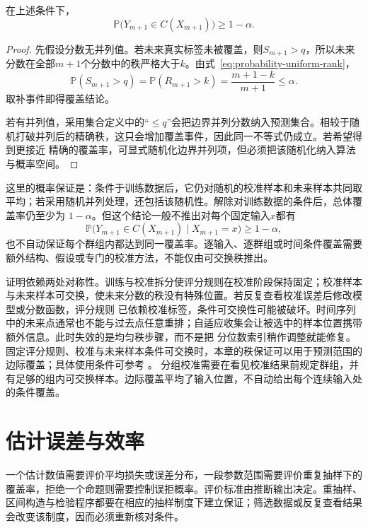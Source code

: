 \begin{theorem}[拆分共形的有限样本覆盖]
\label{thm:probability-split-conformal-coverage}
在上述条件下，
\[ \mathbb{P}\bigl(
    Y_{m+1}\in C(X_{m+1})\bigr)\geq 1-\alpha. \]
\end{theorem}

\begin{proof}
先假设分数无并列值。若未来真实标签未被覆盖，则\(S_{m+1}>q\)，所以未来分数在全部\(m+1\)个分数中的秩严格大于\(k\)。由式~\eqref{eq:probability-uniform-rank}，
\[ \mathbb{P}(S_{m+1}>q)
  =\mathbb{P}(R_{m+1}>k)=\frac{m+1-k}{m+1}\leq\alpha. \]
取补事件即得覆盖结论。

若有并列值，采用集合定义中的“\(\leq q\)”会把边界并列分数纳入预测集合。相较于随机打破并列后的精确秩，这只会增加覆盖事件，因此同一不等式仍成立。若希望得到更接近
精确的覆盖率，可显式随机化边界并列项，但必须把该随机化纳入算法与概率空间。
\end{proof}

这里的概率保证是：条件于训练数据后，它仍对随机的校准样本和未来样本共同取平均；若采用随机并列处理，还包括该随机性。解除对训练数据的条件后，总体覆盖率仍至少为
\(1-\alpha\)。但这个结论一般不推出对每个固定输入\(x\)都有
\[
  \mathbb{P}\bigl(
    Y_{m+1}\in C(X_{m+1})
    \mid X_{m+1}=x
  \bigr)
  \geq1-\alpha,
\]
也不自动保证每个群组内都达到同一覆盖率。逐输入、逐群组或时间条件覆盖需要额外结构、假设或专门的校准方法，不能仅由可交换秩推出。

证明依赖两处对称性。训练与校准拆分使评分规则在校准阶段保持固定；校准样本与未来样本可交换，使未来分数的秩没有特殊位置。若反复查看校准误差后修改模型或分数函数，评分规则
已依赖校准标签，条件可交换性可能被破坏。时间序列中的未来点通常也不能与过去点任意重排；自适应收集会让被选中的样本位置携带额外信息。此时失效的是均匀秩步骤，而不是把
分位数索引稍作调整就能修复。固定评分规则、校准与未来样本条件可交换时，本章的秩保证可以用于预测范围的边际覆盖；具体使用条件可参考
。
分组校准需要在看见校准结果前规定群组，并有足够的组内可交换样本。边际覆盖平均了输入位置，不自动给出每个连续输入处的条件覆盖。

\section{估计误差与效率}
\label{sec:stats-uncertainty-testing-selection}
一个估计数值需要评价平均损失或误差分布，一段参数范围需要评价重复抽样下的覆盖率，拒绝一个命题则需要控制误拒概率。评价标准由推断输出决定。重抽样、区间构造与检验程序都要在相应的抽样制度下建立保证；筛选数据或反复查看结果会改变该制度，因而必须重新核对条件。


